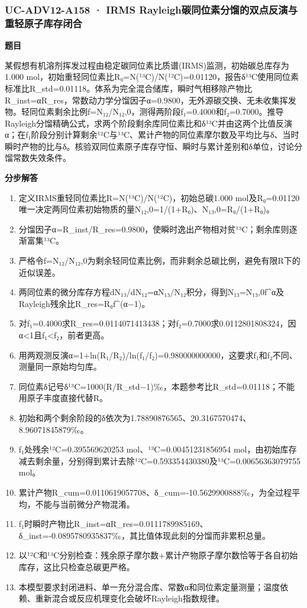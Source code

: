 \documentclass[UTF8,11pt,a4paper]{ctexart}
\begin{document}
\subsubsection*{UC-ADV12-A158 · IRMS Rayleigh碳同位素分馏的双点反演与重轻原子库存闭合}
\noindent\textbf{题目}\par
某假想有机溶剂挥发过程由稳定碳同位素比质谱(IRMS)监测，初始碳总库存为1.000 mol，初始重轻同位素比R₀=N(¹³C)/N(¹²C)=0.01120，报告δ¹³C使用同位素标准比R\_std=0.01118。体系为完全混合储库，瞬时气相移除产物比R\_inst=αR\_res，常数动力学分馏因子α=0.9800，无外源碳交换、无未收集挥发物。轻同位素剩余比例f=N₁₂/N₁₂,0，测得两阶段f₁=0.4000和f₂=0.7000。推导Rayleigh分馏精确公式，求两个阶段剩余库同位素比和δ¹³C并由这两个比值反演α；在f₁阶段分别计算剩余¹²C与¹³C、累计产物的同位素摩尔数及平均比与δ、当时瞬时产物的比与δ。核验双同位素原子库存守恒、瞬时与累计差别和δ单位，讨论分馏常数失效条件。\par
\medskip\noindent\textbf{分步解答}
\begin{enumerate}
\item 定义IRMS重轻同位素比R=N(¹³C)/N(¹²C)，初始总碳1.000 mol及R₀=0.01120唯一决定两同位素初始物质的量N₁₂,0=1/(1+R₀)、N₁₃,0=R₀/(1+R₀)。
\item 分馏因子α=R\_inst/R\_res=0.9800，使瞬时逸出产物相对贫¹³C；剩余库则逐渐富集¹³C。
\item 严格令f=N₁₂/N₁₂,0为剩余轻同位素比例，而非剩余总碳比例，避免有限R下的近似误差。
\item 两同位素的微分库存方程dN₁₃/dN₁₂=αN₁₃/N₁₂积分，得到N₁₃=N₁₃,0f\textasciicircum{}α及Rayleigh残余比R\_res=R₀f\textasciicircum{}(α−1)。
\item 对f₁=0.4000求R\_res=0.0114071413438；对f₂=0.7000求0.0112801808324，因α<1且f₁<f₂，前者更高。
\item 用两观测反演α=1+ln(R₁/R₂)/ln(f₁/f₂)=0.980000000000，这要求f₁和f₂不同、测量同一原始均匀库。
\item 同位素δ记号δ¹³C=1000(R/R\_std−1)‰，本题参考比R\_std=0.01118；不能用原子丰度直接代替R。
\item 初始和两个剩余阶段的δ依次为1.78890876565、20.3167570474、8.96071845879‰。
\item f₁处残余¹²C=0.395569620253 mol、¹³C=0.00451231856954 mol，由初始库存减去剩余量，分别得到累计去除¹²C=0.593354430380及¹³C=0.00656363079755 mol。
\item 累计产物R\_cum=0.0110619057708、δ\_cum=-10.5629900888‰，为全过程平均，不能与当前微分产物混淆。
\item f₁时瞬时产物比R\_inst=αR\_res=0.0111789985169、δ\_inst=-0.0895780935837‰，其比值体现此刻的分馏而非累积总量。
\item 以¹²C和¹³C分别检查：残余原子摩尔数+累计产物原子摩尔数恰等于各自初始库存，这比只检查总碳更严格。
\item 本模型要求封闭进料、单一充分混合库、常数α和同位素定量测量；温度依赖、重新混合或反应机理变化会破坏Rayleigh指数规律。
\end{enumerate}
\end{document}
